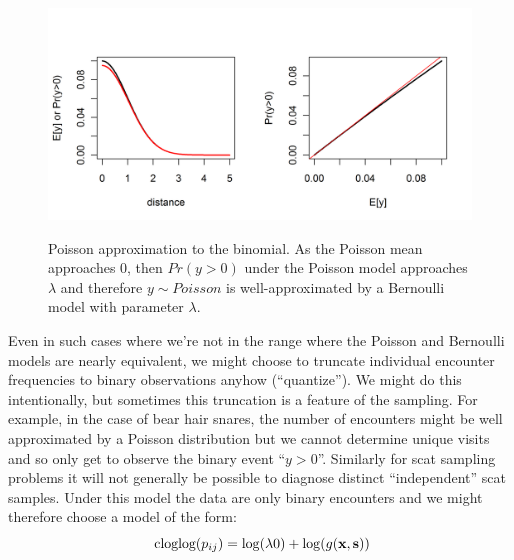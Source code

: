 \begin{figure}
\centering
\includegraphics[width=5in,height=2.5in]{Ch5-PoisMn/figs/Poisson-Bern.png}
\caption{Poisson approximation to the binomial. As the Poisson mean
  approaches 0, then $Pr(y>0)$ under the Poisson model approaches
  $\lambda$ and therefore $y \sim Poisson$ is well-approximated by a
  Bernoulli model with parameter $\lambda$.
}
\label{poisson-mn.fig.poissonbern}
\end{figure}

Even in such cases where we're not in the range where the Poisson and
Bernoulli models are nearly equivalent,
we might choose to truncate  individual encounter frequencies
to binary observations anyhow (``quantize'').
We might do
this intentionally, but sometimes this truncation is a feature of the
sampling. For example, in the case of bear hair snares, the number of
encounters might be well approximated by a Poisson distribution but we
cannot determine unique visits and so only get to observe the binary
event ``$y>0$''. Similarly for scat sampling problems it will not
generally be possible to diagnose distinct ``independent'' scat
samples. Under this model the data are only binary encounters and we
might therefore choose a model of the form:
\[
\mbox{ cloglog}(p_{ij}) = \log(\lambda0)  + \log(g({\bf x},{\bf s}))
\]

